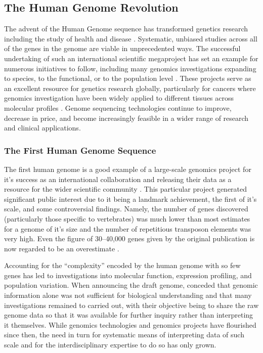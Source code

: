 \subsection{The Human Genome Revolution}
The advent of the Human Genome sequence \citep{Lander2001} has transformed genetics research including the study of health and disease \citep{Peltonen2001, Lander2011}. Systematic, unbiased studies across all of the genes in the genome are viable in unprecedented ways. The successful undertaking of such an international scientific megaproject has set an example for numerous initiatives to follow, including many \gls{genomics} investigations expanding to species, to the functional, or to the population level \citep{Collins2003}. These projects serve as an excellent resource for genetics research globally, particularly for cancers where \gls{genomics} investigation have been widely applied to different tissues across molecular profiles \citet{Bamford2004, ICGC2011, TCGA2013PAN} . Genome sequencing technologies continue to improve, decrease in price, and become increasingly feasible in a wider range of research and clinical applications.

\subsubsection{The First Human Genome Sequence}
The first human genome is a good example of a large-scale \gls{genomics} project for it's success as an international collaboration and releasing their data as a resource for the wider scientific community \citep{Lander2001, Collins2003}. This particular project generated significant public interest due to it being a landmark achievement, the first of it's scale, and some controversial findings. Namely, the number of genes discovered (particularly those specific to vertebrates) was much lower than most estimates for a genome of it's size and the number of repetitious transposon elements was very high. Even the figure of 30--40,000 genes given by the original publication is now regarded to be an overestimate \citep{IHGSC2004, Ezkurdia2014}. 

Accounting for the ``complexity'' encoded by the human genome with so few genes has led to investigations into molecular function, expression profiling, and population variation. When announcing the draft genome, \citet{Lander2001} conceded that genomic information alone was not sufficient for biological understanding and that many investigations remained to carried out, with their objective being to share the raw genome data so that it was available for further inquiry rather than interpreting it themselves. While \gls{genomics} technologies and \gls{genomics} projects have flourished since then, the need in turn for systematic means of interpreting data of such scale and for the interdisciplinary expertise to do so has only grown. 

